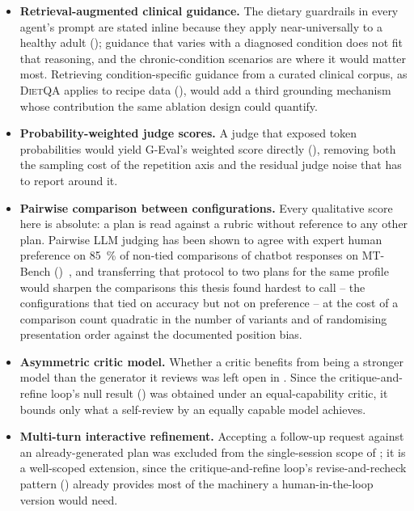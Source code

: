 \begin{itemize}
    \item \textbf{Retrieval-augmented clinical guidance.} The dietary guardrails in every agent's prompt are stated inline because they apply near-universally to a healthy adult (); guidance that varies with a diagnosed condition does not fit that reasoning, and the chronic-condition scenarios are where it would matter most. Retrieving condition-specific guidance from a curated clinical corpus, as \textsc{DietQA} applies to recipe data (), would add a third grounding mechanism whose contribution the same ablation design could quantify.
    \item \textbf{Probability-weighted judge scores.} A judge that exposed token probabilities would yield G-Eval's weighted score directly (), removing both the sampling cost of the repetition axis and the residual judge noise that  has to report around it.
    \item \textbf{Pairwise comparison between configurations.} Every qualitative score here is absolute: a plan is read against a rubric without reference to any other plan. Pairwise LLM judging has been shown to agree with expert human preference on \qty{85}{\percent} of non-tied comparisons of chatbot responses on MT-Bench ()~\cite{zheng2023judging}, and transferring that protocol to two plans for the same profile would sharpen the comparisons this thesis found hardest to call -- the configurations that tied on accuracy but not on preference -- at the cost of a comparison count quadratic in the number of variants and of randomising presentation order against the documented position bias.
    \item \textbf{Asymmetric critic model.} Whether a critic benefits from being a stronger model than the generator it reviews was left open in . Since the critique-and-refine loop's null result () was obtained under an equal-capability critic, it bounds only what a self-review by an equally capable model achieves.
    \item \textbf{Multi-turn interactive refinement.} Accepting a follow-up request against an already-generated plan was excluded from the single-session scope of ; it is a well-scoped extension, since the critique-and-refine loop's revise-and-recheck pattern () already provides most of the machinery a human-in-the-loop version would need.

\end{itemize}
